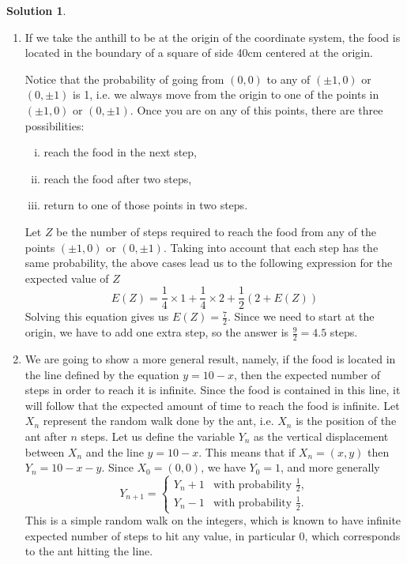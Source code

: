 \documentclass{article}
\theoremstyle{plain}
\theoremstyle{definition}
\newtheorem*{sol*}{Solution}
\begin{document}
\begin{sol*}\
  \begin{enumerate}
    \item If we take the anthill to be at the origin of the coordinate system, the food is located in the boundary of a square of side 40cm centered at the origin. %
  

    Notice that the probability of going from $(0,0)$ to any of $(\pm 1,0)$ or $(0, \pm 1)$ is 1, i.e. we always move from the origin to one of the points in $(\pm 1,0)$ or $(0, \pm 1)$. Once you are on any of this points, there are three possibilities:
    \begin{enumerate}[(i)]
      \item reach the food in the next step,
      \item reach the food after two steps,
      \item return to one of those points in two steps.
    \end{enumerate}
    Let $Z$ be the number of steps required to reach the food from any of the points $(\pm 1,0)$ or $(0, \pm 1)$. Taking into account that each step has the same probability, the above cases lead us to the following expression for the expected value of $Z$
    \[E(Z) = \frac{1}{4}\times 1 + \frac{1}{4}\times 2 + \frac{1}{2}(2+E(Z))\]
    Solving this equation gives us $E(Z) = \frac{7}{2}$. Since we need to start at the origin, we have to add one extra step, so the answer is $\frac{9}{2}=4.5$ steps.

    \item We are going to show a more general result, namely, if the food is located in the line defined by the equation $y = 10 - x$, then the expected number of steps in order to reach it is infinite. Since the food is contained in this line, it will follow that the expected amount of time to reach the food is infinite.
    Let $X_n$ represent the random walk done by the ant, i.e. $X_n$ is the position of the ant after $n$ steps. Let us define the variable $Y_n$ as the vertical displacement between $X_n$ and the line $y=10-x$. This means that if $X_n=(x,y)$ then $Y_n = 10 - x - y$. Since $X_0=(0,0)$, we have $Y_0 = 1$, and more generally
    \[
    Y_{n+1} = \left\{ \begin{matrix}
      Y_n + 1 & \text{with probability }\frac{1}{2},\\
      Y_n - 1 & \text{with probability }\frac{1}{2}.
    \end{matrix}
    \right.  
    \]
    This is a simple random walk on the integers, which is known to have infinite expected number of steps to hit any value, in particular 0, which corresponds to the ant hitting the line.
    

\end{enumerate}
\end{sol*}
\end{document}
